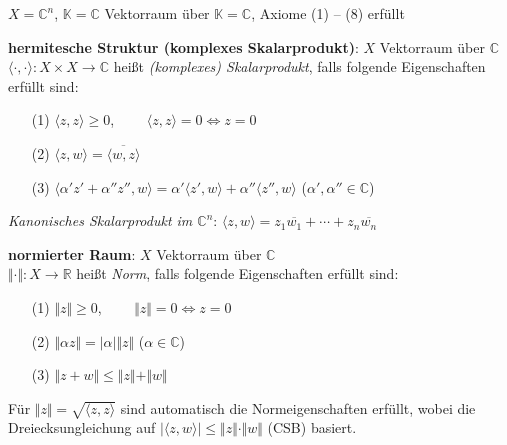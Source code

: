 $X = \mathbb{C}^n$, $\mathbb{K} = \mathbb{C}$ Vektorraum über
$\mathbb{K} = \mathbb{C}$, Axiome (1) -- (8) erfüllt

\linie

\textbf{hermitesche Struktur (komplexes Skalarprodukt)}:
$X$ Vektorraum über $\mathbb{C}$ \\
$\langle \cdot, \cdot \rangle:
X \times X \rightarrow \mathbb{C}$ heißt \emph{(komplexes) Skalarprodukt},
falls folgende Eigenschaften erfüllt sind:

\begin{itemize}
    \item[(1)] $\langle z, z \rangle \ge 0$,
    $\qquad \langle z, z \rangle = 0 \Leftrightarrow z = 0$
    
    \item[(2)] $\langle z, w \rangle = \overline{\langle w, z \rangle}$
    
    \item[(3)] $\langle \alpha' z' + \alpha'' z'', w \rangle =
    \alpha' \langle z', w \rangle + \alpha'' \langle z'', w \rangle$
    \qquad ($\alpha', \alpha'' \in \mathbb{C}$)
\end{itemize}

\emph{Kanonisches Skalarprodukt im $\mathbb{C}^n$}:
$\langle z, w \rangle = z_1 \overline{w_1} + \cdots + z_n \overline{w_n}$

\linie

\textbf{normierter Raum}:
$X$ Vektorraum über $\mathbb{C}$ \\
$\Vert \cdot \Vert: X \rightarrow \mathbb{R}$ heißt \emph{Norm}, falls
folgende Eigenschaften erfüllt sind:

\begin{itemize}
    \item[(1)] $\Vert z \Vert \ge 0$,
    $\qquad \Vert z \Vert = 0 \Leftrightarrow z = 0$
    
    \item[(2)] $\Vert \alpha z \Vert = |\alpha| \Vert z \Vert$
    \qquad ($\alpha \in \mathbb{C}$)
    
    \item[(3)] $\Vert z + w \Vert \le \Vert z \Vert + \Vert w \Vert$
\end{itemize}

Für $\Vert z \Vert = \sqrt{\langle z, z \rangle}$ sind automatisch die
Normeigenschaften erfüllt, wobei die Dreiecksungleichung auf
$|\langle z, w \rangle| \le \Vert z \Vert \cdot \Vert w \Vert$ (CSB) basiert.

\linie

